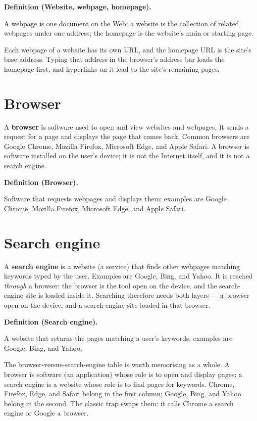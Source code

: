 \documentclass[11pt]{article}
\newenvironment{definitionbox}[1]{%
  \par\noindent\textbf{Definition (#1).}\ \itshape
}{\par\vspace{0.3em}}
\begin{document}
\begin{definitionbox}{Website, webpage, homepage}
A webpage is one document on the Web; a website is the collection of related
webpages under one address; the homepage is the website's main or starting
page.
\end{definitionbox}

Each webpage of a website has its own URL, and the homepage URL is the
site's base address. Typing that address in the browser's address bar loads
the homepage first, and hyperlinks on it lead to the site's remaining pages.

\section{Browser}
A \textbf{browser} is software used to open and view websites and webpages.
It sends a request for a page and displays the page that comes back. Common
browsers are Google Chrome, Mozilla Firefox, Microsoft Edge, and Apple
Safari. A browser is software installed on the user's device; it is not the
Internet itself, and it is not a search engine.

\begin{definitionbox}{Browser}
Software that requests webpages and displays them; examples are Google
Chrome, Mozilla Firefox, Microsoft Edge, and Apple Safari.
\end{definitionbox}

\section{Search engine}
A \textbf{search engine} is a website (a service) that finds other webpages
matching keywords typed by the user. Examples are Google, Bing, and Yahoo.
It is reached \emph{through} a browser: the browser is the tool open on the
device, and the search-engine site is loaded inside it. Searching therefore
needs both layers --- a browser open on the device, and a search-engine site
loaded in that browser.

\begin{definitionbox}{Search engine}
A website that returns the pages matching a user's keywords; examples are
Google, Bing, and Yahoo.
\end{definitionbox}

The browser-versus-search-engine table is worth memorising as a whole. A
browser is software (an application) whose role is to open and display pages;
a search engine is a website whose role is to find pages for keywords. Chrome,
Firefox, Edge, and Safari belong in the first column; Google, Bing, and
Yahoo belong in the second. The classic trap swaps them: it calls Chrome a
search engine or Google a browser.
\end{document}
